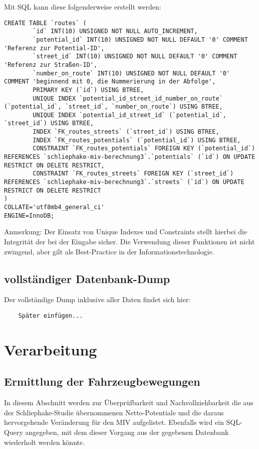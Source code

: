\documentclass[fontsize=12pt,a4paper]{scrreprt}
\begin{document}
Mit SQL kann diese folgenderweise erstellt werden:

\begin{verbatim}
CREATE TABLE `routes` (
        `id` INT(10) UNSIGNED NOT NULL AUTO_INCREMENT,
        `potential_id` INT(10) UNSIGNED NOT NULL DEFAULT '0' COMMENT 'Referenz zur Potential-ID',
        `street_id` INT(10) UNSIGNED NOT NULL DEFAULT '0' COMMENT 'Referenz zur Straßen-ID',
        `number_on_route` INT(10) UNSIGNED NOT NULL DEFAULT '0' COMMENT 'beginnend mit 0, die Nummerierung in der Abfolge',
        PRIMARY KEY (`id`) USING BTREE,
        UNIQUE INDEX `potential_id_street_id_number_on_route` (`potential_id`, `street_id`, `number_on_route`) USING BTREE,
        UNIQUE INDEX `potential_id_street_id` (`potential_id`, `street_id`) USING BTREE,
        INDEX `FK_routes_streets` (`street_id`) USING BTREE,
        INDEX `FK_routes_potentials` (`potential_id`) USING BTREE,
        CONSTRAINT `FK_routes_potentials` FOREIGN KEY (`potential_id`) REFERENCES `schliephake-miv-berechnung3`.`potentials` (`id`) ON UPDATE RESTRICT ON DELETE RESTRICT,
        CONSTRAINT `FK_routes_streets` FOREIGN KEY (`street_id`) REFERENCES `schliephake-miv-berechnung3`.`streets` (`id`) ON UPDATE RESTRICT ON DELETE RESTRICT
)
COLLATE='utf8mb4_general_ci'
ENGINE=InnoDB;      
\end{verbatim}

Anmerkung: Der Einsatz von Unique Indexes und Constraints stellt hierbei die Integrität der bei der Eingabe sicher. Die Verwendung dieser Funktionen ist nicht zwingend, aber gilt als Best-Practice in der Informationstechnologie.


\section{vollständiger Datenbank-Dump}
Der vollständige Dump inklusive aller Daten findet sich hier:
\begin{verbatim}
    Später einfügen...
    \end{verbatim}
\chapter{Verarbeitung}
\section{Ermittlung der Fahrzeugbewegungen}
In diesem Abschnitt werden zur Überprüfbarkeit und Nachvollziehbarkeit die aus der Schliephake-Studie übernommenen Netto-Potentiale und die daraus hervorgehende Veränderung für den MIV aufgelistet. Ebenfalls wird ein SQL-Query angegeben, mit dem dieser Vorgang aus der gegebenen Datenbank wiederholt werden könnte.
\end{document}
